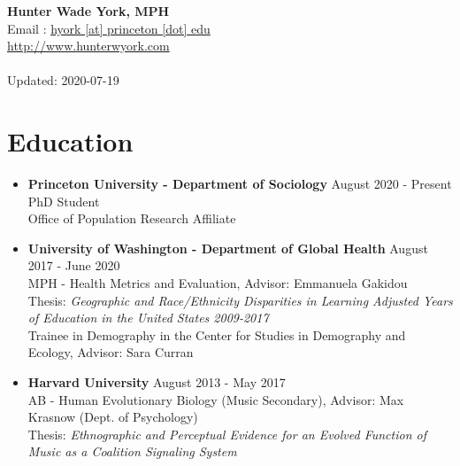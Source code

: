 \documentclass[letterpaper,11pt]{article}
\begin{document}


\begin{flushright}

\textbf{\Large Hunter Wade York, MPH}\\
Email : \href{mailto:hyork [at] princeton [dot] edu}{hyork [at] princeton [dot] edu}\\
\href{http://hunterwyork.com/}{http://www.hunterwyork.com}\\~\\
Updated: 2020-07-19

\end{flushright}



\section*{Education}
\begin{itemize}[leftmargin=*, label={}]
    \item \textbf{Princeton University - Department of Sociology} \hfill August 2020 - Present\\
    PhD Student\\
    Office of Population Research Affiliate
    \item \textbf{University of Washington - Department of Global Health} \hfill August 2017 - June 2020\\
    MPH - Health Metrics and Evaluation, Advisor: Emmanuela Gakidou\\
    Thesis: \textit{Geographic and Race/Ethnicity Disparities in Learning Adjusted Years of Education in the United States 2009-2017}\\
    Trainee in Demography in the Center for Studies in Demography and Ecology, Advisor: Sara Curran
    \item \textbf{Harvard University} \hfill August 2013 - May 2017\\
    AB - Human Evolutionary Biology (Music Secondary), Advisor: Max Krasnow (Dept. of Psychology)\\
    Thesis: \textit{Ethnographic and Perceptual Evidence for an Evolved Function of Music as a Coalition Signaling System}
\end{itemize}



\end{document}
